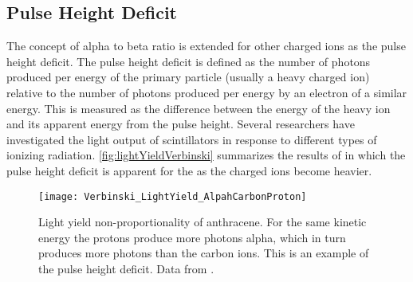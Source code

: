 \subsection{Pulse Height Deficit}
\label{sec:PulseHeightDeficit}
The concept of alpha to beta ratio is extended for other charged ions as the pulse height deficit.
The pulse height deficit is defined as the number of photons produced per energy of the primary particle (usually a heavy charged ion) relative to the number of photons produced per energy by an electron of a similar energy.
This is measured as the difference between the energy of the heavy ion and its apparent energy from the pulse height.  
Several researchers have investigated the light output of scintillators in response to different types of ionizing radiation.
\autoref{fig:lightYieldVerbinski} summarizes the results of \cite{Verbinski_1968} in which the pulse height deficit is apparent for the as the charged ions become heavier.
\begin{figure}
  \centering
  \texttt{[image: Verbinski\_LightYield\_AlpahCarbonProton]}
  \caption[Light yield non-proportionality of anthracene]{Light yield non-proportionality of anthracene. For the same kinetic energy the protons produce more photons alpha, which in turn produces more photons than the  carbon ions. This is an example of the pulse height deficit. Data from \cite{Verbinski_1968}.}
  \label{fig:lightYieldVerbinski}
\end{figure}

